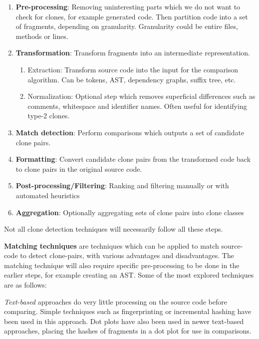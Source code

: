 \documentclass[12pt]{article}
\begin{document}
\begin{enumerate}
	\item \textbf{Pre-processing}: Removing uninteresting parts which we do not want to
	      check for clones, for example generated code. Then partition code into a set of
	      fragments, depending on granularity. Granularity could be entire files, methods or lines.
	\item \textbf{Transformation}: Transform fragments into an intermediate representation.
	      \begin{enumerate}
		      \item Extraction: Transform source code into the input for the comparison
		            algorithm. Can be tokens, AST, dependency graphs, suffix tree, etc.
		      \item Normalization: Optional step which removes superficial differences such as
		            comments, whitespace and identifier names. Often useful for identifying type-2
		            clones.
	      \end{enumerate}
	\item \textbf{Match detection}: Perform comparisons which outputs a set of
	      candidate clone pairs.
	\item \textbf{Formatting}: Convert candidate clone pairs from the transformed
	      code back to clone pairs in the original source code.
	\item \textbf{Post-processing/Filtering}: Ranking and filtering manually or with
	      automated heuristics
	\item \textbf{Aggregation}: Optionally aggregating sets of clone pairs into clone classes
\end{enumerate}

Not all clone detection techniques will necessarily follow all these steps.

\textbf{Matching techniques} are techniques which can be applied to match source-code to
detect clone-pairs, with various advantages and disadvantages. The matching technique will
also require specific pre-processing to be done in the earlier steps, for example creating an
AST. Some of the most explored techniques are as follows\cite{ComparisonAndEvaluationOfTechniques}:

\textit{Text-based} approaches do very little processing on the source code before
comparing. Simple techniques such as fingerprinting or incremental hashing have been used
in this approach. Dot plots have also been used in newer text-based approaches, placing
the hashes of fragments in a dot plot for use in comparisons.
\end{document}
